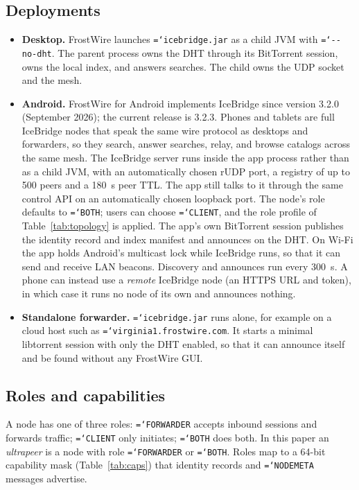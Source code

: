 \documentclass[11pt,a4paper]{article}
\newcommand{\code}[1]{\texttt{\hyphenchar\font=`\-\relax #1}}
\DeclareRobustCommand{\_}{\origunderscore\allowbreak}
\begin{document}
\subsection{Deployments}
\begin{itemize}
\item \textbf{Desktop.} FrostWire launches \code{icebridge.jar} as a child JVM with
  \code{-{}-no-dht}. The parent process owns the DHT through its BitTorrent session, owns
  the local index, and answers searches. The child owns the UDP socket and the mesh.
\item \textbf{Android.} FrostWire for Android implements IceBridge since version 3.2.0
  (September 2026); the current release is 3.2.3. Phones and tablets are full IceBridge nodes
  that speak the same wire protocol as desktops and forwarders, so they search, answer
  searches, relay, and browse catalogs across the same mesh. The IceBridge server runs inside
  the app process rather than as a child JVM, with an automatically chosen rUDP port, a
  registry of up to 500 peers and a 180~s peer TTL. The app still talks to it through the same
  control API on an automatically chosen loopback port. The node's role defaults to
  \code{BOTH}; users can choose \code{CLIENT}, and the role profile of
  Table~\ref{tab:topology} is applied. The app's own BitTorrent session publishes the identity
  record and index manifest and announces on the DHT. On Wi-Fi the app holds Android's multicast
  lock while IceBridge runs, so that it can send and receive LAN beacons. Discovery and
  announces run every 300~s. A phone can instead use a \emph{remote} IceBridge
  node (an HTTPS URL and token), in which case it runs no node of its own and announces
  nothing.
\item \textbf{Standalone forwarder.} \code{icebridge.jar} runs alone, for example on a
  cloud host such as \code{virginia1.frostwire.com}. It starts a minimal libtorrent session
  with only the DHT enabled, so that it can announce itself and be found without any
  FrostWire GUI.
\end{itemize}

\subsection{Roles and capabilities}
A node has one of three roles: \code{FORWARDER} accepts inbound sessions and forwards
traffic; \code{CLIENT} only initiates; \code{BOTH} does both. In this paper an
\emph{ultrapeer} is a node with role \code{FORWARDER} or \code{BOTH}. Roles map to a 64-bit
capability mask (Table~\ref{tab:caps}) that identity records and \code{NODE\_META}
messages advertise.
\end{document}
